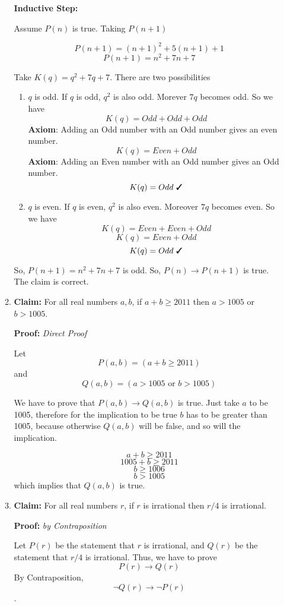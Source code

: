 \documentclass[11pt]{article}
\newcommand{\cmark}{\ding{51}}%
\begin{document}
\begin{enumerate}
\begin{enumerate}
			\textbf{Inductive Step:}
			
			Assume $P(n)$ is true. Taking $P(n+1)$
			
			$$P(n+1) = (n+1)^2 + 5(n+1) + 1$$  
			$$P(n+1) = n^2 + 7n + 7$$ 
			
			Take $K(q) = q^2 + 7q + 7$. There are two possibilities 
			\begin{enumerate}
				\item $q$ is odd. If $q$ is odd, $q^2$ is also odd. Morever $7q$ becomes odd. So we have
				$$K(q) = Odd + Odd + Odd $$ 
				\textbf{Axiom}: Adding an Odd number with an Odd number gives an even number.
				$$K(q) = Even + Odd $$ 
				\textbf{Axiom}: Adding an Even number with an Odd number gives an Odd number.
				$$K(q) = Odd \text{ \cmark}$$ 
				
				\item $q$ is even. If $q$ is even, $q^2$ is also even. Moreover $7q$ becomes even. So we have
				$$K(q) = Even + Even + Odd $$ 
				$$K(q) = Even + Odd $$ 
				$$K(q) = Odd \text{ \cmark}$$ 
				
			\end{enumerate}
			
			
			So, $P(n+1) = n^2 + 7n + 7$ is odd. So, $P(n) \rightarrow P(n+1)$ is true. The claim is correct. \cmark \\
			
			
			\item \textbf{Claim:} For all real numbers $a,b$, if $a+b\ge 2011$ then $a > 1005$ or $b > 1005$.
			
			\textbf{Proof:} \textit{Direct Proof}
			
			Let $$P(a, b) = (a+b\ge 2011)$$ and $$Q(a, b) = (a > 1005 \text{ or } b > 1005)$$
			
			We have to prove that $P(a, b) \rightarrow Q(a, b)$ is true. Just take $a$ to be 1005, therefore for the implication to be true $b$ has to be greater than 1005, because otherwise $Q(a, b)$ will be false, and so will the implication. 
			
			$$a + b \ge 2011$$
			$$1005 + b \ge 2011$$
			$$b \ge 1006 $$ 
			$$b > 1005 $$ which implies that $Q(a, b)$ is true. \cmark
			
			\item \textbf{Claim:} For all real numbers $r$, if $r$ is irrational then $r/4$ is irrational.
			
			\textbf{Proof:}  \textit{by Contraposition}
			
			Let $P(r)$ be the statement that $r$ is irrational, and $Q(r)$ be the statement that $r/4$ is irrational. Thus, we have to prove $$P(r) \rightarrow Q(r)$$ By Contraposition, $$\lnot Q(r) \rightarrow \lnot P(r)$$.
			

\end{enumerate}
\end{enumerate}
\end{document}
